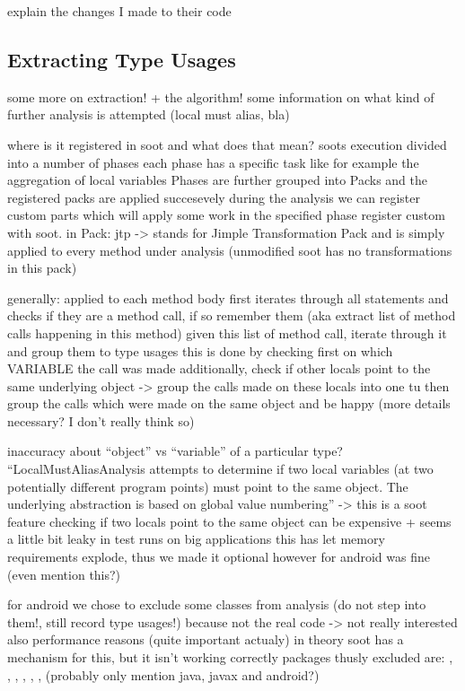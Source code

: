 explain the changes I made to their code

\subsection{Extracting Type Usages}

some more on extraction! + the algorithm!
some information on what kind of further analysis is attempted (local must alias, bla)

where is it registered in soot and what does that mean?
soots execution divided into a number of phases
each phase has a specific task like for example the aggregation of local variables
Phases are further grouped into Packs and the registered packs are applied succesevely during the analysis
we can register custom parts which will apply some work in the specified phase
register custom  with soot.
in Pack: jtp -> stands for Jimple Transformation Pack  and is simply applied to every method under analysis (unmodified soot has no transformations in this pack)

generally: applied to each method body
first iterates through all statements and checks if they are a method call, if so remember them (aka extract list of method calls happening in this method)
given this list of method call, iterate through it and group them to type usages
this is done by checking first on which VARIABLE the call was made
additionally, check if other locals point to the same underlying object -> group the calls made on these locals into one tu
then group the calls which were made on the same object and be happy
(more details necessary? I don't really think so)

inaccuracy about ``object'' vs ``variable'' of a particular type?
``LocalMustAliasAnalysis attempts to determine if two local variables (at two potentially different program points) must point to the same object. The underlying abstraction is based on global value numbering'' -> this is a soot feature
checking if two locals point to the same object can be expensive + seems a little bit leaky
in test runs on big applications this has let memory requirements explode, thus we made it optional
however for android was fine (even mention this?)

for android we chose to exclude some classes from analysis (do not step into them!, still record type usages!)
because not the real code -> not really interested 
also performance reasons (quite important actualy)
in theory soot has a mechanism for this, but it isn't working correctly
packages thusly excluded are:
, , , , , , 
(probably only mention java, javax and android?)

